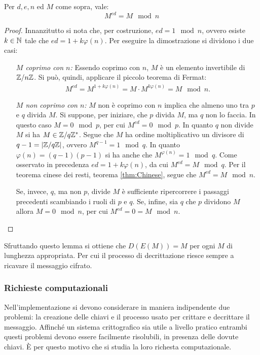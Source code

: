 \begin{lem}
 Per $d, e, n$ ed $M$ come sopra, vale:
 \begin{equation}
  M^{ed} = M \mod n
 \end{equation}
\end{lem}
\begin{proof}
 Innanzitutto si nota che, per costruzione, $ed = 1 \mod n$, ovvero esiste $k \in \mathbb{N}$ tale che $ed = 1 + k\varphi(n)$.
 Per eseguire la dimostrazione si dividono i due casi:
 \begin{enumerate}[align=left]
  \item[\textit{$M$ coprimo con $n$:}] Essendo coprimo con $n$, $M$ è un elemento invertibile di $\mathbb{Z}/{n}\mathbb{Z}$. 
  Si può, quindi, applicare il piccolo teorema di Fermat:
  \begin{align}
   M^{ed} = M^{1+k\varphi(n)} = M \cdot M^{k\varphi(n)} = M \mod n.
  \end{align}
  \item[\textit{$M$ non coprimo con $n$:}] $M$ non è coprimo con $n$ implica che almeno uno tra $p$ e $q$ divida $M$.
  Si suppone, per iniziare, che $p$ divida $M$, ma $q$ non lo faccia.
  In questo caso $M = 0 \mod p$, per cui $M^{ed} = 0 \mod p$.
  In quanto $q$ non divide $M$ si ha $M \in \mathbb{Z}/{q}\mathbb{Z}^*$.
  Segue che $M$ ha ordine moltiplicativo un divisore di $q-1 = \left|\mathbb{Z}/{q}\mathbb{Z}\right|$, ovvero $M^{q-1} = 1 \mod q$. 
  In quanto $\varphi(n) = (q-1)(p-1)$ si ha anche che $M^{\varphi(n)} = 1 \mod q$. 
  Come osservato in precedenza $ed = 1 + k\varphi(n)$, da cui $M^{ed} = M \mod q$.
  Per il teorema cinese dei resti, teorema \ref{thm:Chinese}, segue che $M^{ed} = M \mod n$.
  
  Se, invece, $q$, ma non $p$, divide $M$ è sufficiente ripercorrere i passaggi precedenti scambiando i ruoli di $p$ e $q$.
  Se, infine, sia $q$ che $p$ dividono $M$ allora $M = 0 \mod n$, per cui ${M^{ed} = 0 = M \mod n}$.\qedhere
 \end{enumerate}
\end{proof}

Sfruttando questo lemma si ottiene che $D(E(M)) = M$ per ogni $M$ di lunghezza appropriata.
Per cui il processo di decrittazione riesce sempre a ricavare il messaggio cifrato.

\subsubsection{Richieste computazionali}
Nell'implementazione si devono considerare in maniera indipendente due problemi: la creazione delle chiavi e il processo usato per crittare e decrittare il messaggio.
Affinché un sistema crittografico sia utile a livello pratico entrambi questi problemi devono essere facilmente risolubili, in presenza delle dovute chiavi.
È per questo motivo che si studia la loro richesta computazionale.

